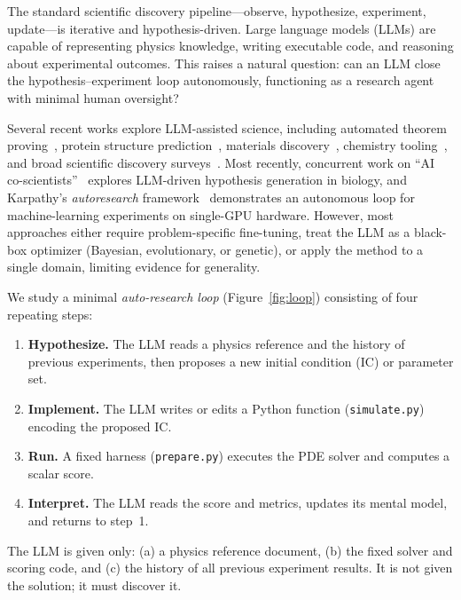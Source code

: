 \documentclass[11pt]{article}
\begin{document}
The standard scientific discovery pipeline---observe, hypothesize, experiment,
update---is iterative and hypothesis-driven.
Large language models (LLMs) are capable of representing physics knowledge,
writing executable code, and reasoning about experimental outcomes.
This raises a natural question: can an LLM close the hypothesis--experiment loop
autonomously, functioning as a research agent with minimal human oversight?

Several recent works explore LLM-assisted science, including automated theorem
proving~\cite{trinh2024alphageometry}, protein structure
prediction~\cite{jumper2021alphafold}, materials
discovery~\cite{merchant2023scaling}, chemistry
tooling~\cite{bran2023chemcrow}, and broad scientific
discovery surveys~\cite{wang2023scientific}.
Most recently, concurrent work on ``AI co-scientists''~\cite{gottweis2025aiscientist}
explores LLM-driven hypothesis generation in biology, and Karpathy's \emph{autoresearch}
framework~\cite{karpathy2025autoresearch} demonstrates an autonomous loop for
machine-learning experiments on single-GPU hardware.
However, most approaches either require problem-specific fine-tuning, treat
the LLM as a black-box optimizer (Bayesian, evolutionary, or genetic), or
apply the method to a single domain, limiting evidence for generality.

We study a minimal \emph{auto-research loop} (Figure~\ref{fig:loop})
consisting of four repeating steps:
\begin{enumerate}
  \item \textbf{Hypothesize.} The LLM reads a physics reference and the
        history of previous experiments, then proposes a new initial
        condition (IC) or parameter set.
  \item \textbf{Implement.} The LLM writes or edits a Python function
        (\texttt{simulate.py}) encoding the proposed IC.
  \item \textbf{Run.} A fixed harness (\texttt{prepare.py}) executes the PDE
        solver and computes a scalar score.
  \item \textbf{Interpret.} The LLM reads the score and metrics, updates its
        mental model, and returns to step~1.
\end{enumerate}
The LLM is given only: (a) a physics reference document, (b) the fixed solver
and scoring code, and (c) the history of all previous experiment results.
It is not given the solution; it must discover it.
\end{document}
